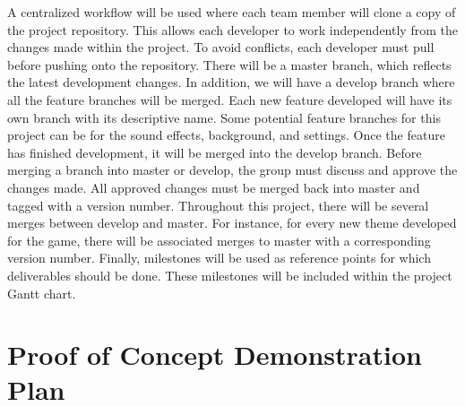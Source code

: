 \documentclass{article}
\begin{document}
	A centralized workflow will be used where each team member will clone a copy of the project repository.
	This allows each developer to work independently from the changes made within the project. 
	To avoid conflicts, each developer must pull before pushing onto the repository. 
	There will be a master branch, which reflects the latest development changes. 
	In addition, we will have a develop branch where all the feature branches will be merged.
	Each new feature developed will have its own branch with its descriptive name.
	Some potential feature branches for this project can be for the sound effects, background, and settings. 
	Once the feature has finished development, it will be merged into the develop branch. 
	Before merging a branch into master or develop, the group must discuss and approve the changes made. 
	All approved changes must be merged back into master and tagged with a version number. 
	Throughout this project, there will be several merges between develop and master. 
	For instance, for every new theme developed for the game, there will be associated merges to master with a corresponding version number. Finally, milestones will be used as reference points for which deliverables should be done. These milestones will be included within the project Gantt chart.

	
	\section{Proof of Concept Demonstration Plan}
\end{document}
